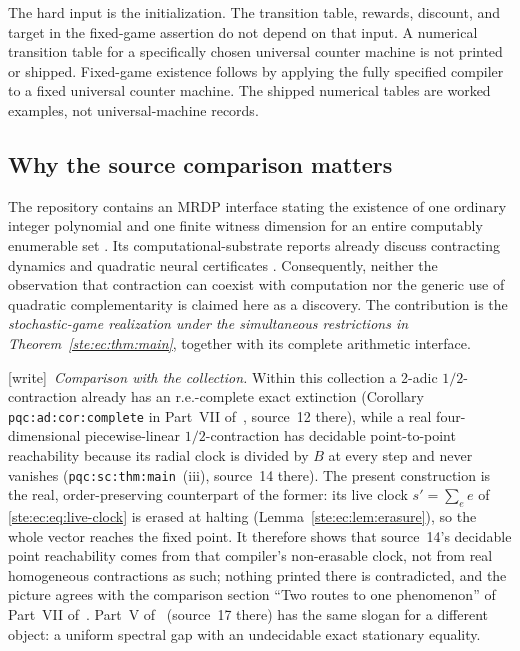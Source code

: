 \documentclass[11pt,letterpaper]{article}
\theoremstyle{definition}
\theoremstyle{remark}
\newcommand{\wtag}{\textup{[write]}}
\begin{document}
The hard input is the initialization. The transition table, rewards,
discount, and target in the fixed-game assertion do not depend on that input.
A numerical transition table for a specifically chosen universal counter
machine is not printed or shipped. Fixed-game existence follows by applying
the fully specified compiler to a fixed universal counter machine. The
shipped numerical tables are worked examples, not universal-machine records.

\subsection{Why the source comparison matters}

The repository contains an MRDP interface stating the existence of one
ordinary integer polynomial and one finite witness dimension for an entire
computably enumerable set \cite{repo-mrdp}. Its computational-substrate
reports already discuss contracting dynamics and quadratic neural
certificates \cite{repoProb}. Consequently, neither the observation
that contraction can coexist with computation nor the generic use of
quadratic complementarity is claimed here as a discovery. The contribution
is the \emph{stochastic-game realization under the simultaneous restrictions
in Theorem~\ref{ste:ec:thm:main}}, together with its complete arithmetic interface.

\wtag\ \emph{Comparison with the collection.} Within this collection a 2-adic $1/2$-contraction already has an r.e.-complete exact extinction (Corollary \texttt{pqc:ad:cor:complete} in Part~VII of~\cite{pqc}, source~12 there), while a real four-dimensional piecewise-linear $1/2$-contraction has decidable point-to-point reachability because its radial clock is divided by $B$ at every step and never vanishes (\texttt{pqc:sc:thm:main}~(iii), source~14 there). The present construction is the real, order-preserving counterpart of the former: its live clock $s'=\sum_ee$ of \eqref{ste:ec:eq:live-clock} is erased at halting (Lemma~\ref{ste:ec:lem:erasure}), so the whole vector reaches the fixed point. It therefore shows that source~14's decidable point reachability comes from that compiler's non-erasable clock, not from real homogeneous contractions as such; nothing printed there is contradicted, and the picture agrees with the comparison section ``Two routes to one phenomenon'' of Part~VII of~\cite{pqc}. Part~V of~\cite{pqc} (source~17 there) has the same slogan for a different object: a uniform spectral gap with an undecidable exact stationary equality.
\end{document}
